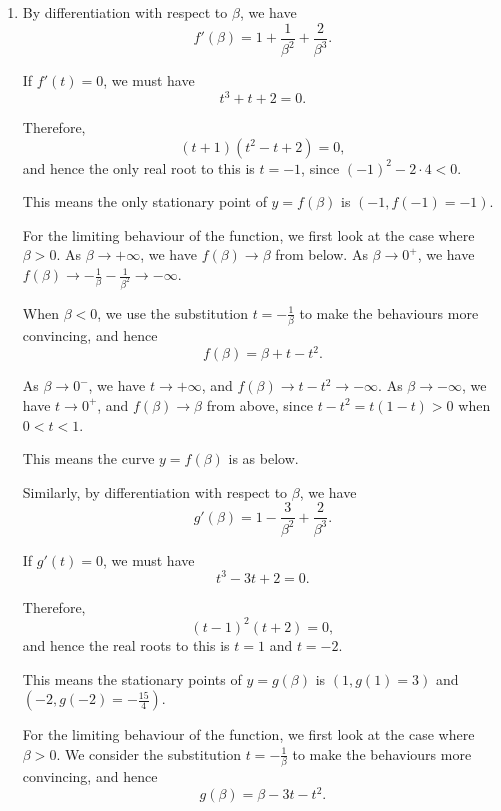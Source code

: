 \Question{\currfilebase}

\begin{enumerate}
    \item By differentiation with respect to \(\beta\), we have
          \[
              f'(\beta) = 1 + \frac{1}{\beta^2} + \frac{2}{\beta^3}.
          \]

          If \(f'(t) = 0\), we must have
          \[
              t^3 + t + 2 = 0.
          \]

          Therefore,
          \[
              (t + 1)(t^2 - t + 2) = 0,
          \]
          and hence the only real root to this is \(t = -1\), since \((-1)^2 - 2 \cdot 4 < 0\).

          This means the only stationary point of \(y = f(\beta)\) is \((-1, f(-1) = -1)\).

          For the limiting behaviour of the function, we first look at the case where \(\beta > 0\). As \(\beta \to +\infty\), we have \(f(\beta) \to \beta\) from below. As \(\beta \to 0^{+}\), we have \(f(\beta) \to -\frac{1}{\beta} - \frac{1}{\beta^2} \to -\infty\).

          When \(\beta < 0\), we use the substitution \(t = -\frac{1}{\beta}\) to make the behaviours more convincing, and hence
          \[
              f(\beta) = \beta + t - t^2.
          \]

          As \(\beta \to 0^{-}\), we have \(t \to +\infty\), and \(f(\beta) \to t - t^2 \to -\infty\). As \(\beta \to -\infty\), we have \(t \to 0^{+}\), and \(f(\beta) \to \beta\) from above, since \(t - t^2 = t (1 - t) > 0\) when \(0 < t < 1\).

          This means the curve \(y = f(\beta)\) is as below.

          Similarly, by differentiation with respect to \(\beta\), we have
          \[
              g'(\beta) = 1 - \frac{3}{\beta^2} + \frac{2}{\beta^3}.
          \]

          If \(g'(t) = 0\), we must have
          \[
              t^3 - 3t + 2 = 0.
          \]

          Therefore,
          \[
              (t - 1)^2(t + 2) = 0,
          \]
          and hence the real roots to this is \(t = 1\) and \(t = -2\).

          This means the stationary points of \(y = g(\beta)\) is \((1, g(1) = 3)\) and \((-2, g(-2) = -\frac{15}{4})\).

          For the limiting behaviour of the function, we first look at the case where \(\beta > 0\). We consider the substitution \(t = -\frac{1}{\beta}\) to make the behaviours more convincing, and hence
          \[
              g(\beta) = \beta - 3t - t^2.
          \]


\end{enumerate}
